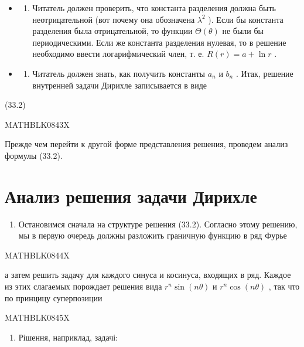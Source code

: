 \documentclass[
  ukrainian,
]{article}
\providecommand{\tightlist}{%
  \setlength{\itemsep}{0pt}\setlength{\parskip}{0pt}}
\begin{document}
\begin{itemize}
\tightlist
\item
  \begin{enumerate}
  \def\labelenumi{\arabic{enumi}.}
  \tightlist
  \item
    Читатель должен проверить, что константа разделения должна быть
    неотрицательной (вот почему она обозначена \(\lambda^2\) ). Если бы
    константа разделения была отрицательной, то функции
    \(\Theta(\theta)\) не были бы периодическими. Если же константа
    разделения нулевая, то в решение необходимо ввести логарифмический
    член, т. е. \(R(r) = a + \ln r\) .
  \end{enumerate}
\item
  \begin{enumerate}
  \def\labelenumi{\arabic{enumi}.}
  \setcounter{enumi}{1}
  \tightlist
  \item
    Читатель должен знать, как получить константы \(a_n\) и \(b_n\) .
    Итак, решение внутренней задачи Дирихле записывается в виде
  \end{enumerate}
\end{itemize}

(33.2)

MATHBLK0843X

Прежде чем перейти к другой форме представления решения, проведем анализ
формулы (33.2).

\section{Анализ решения задачи
Дирихле}\label{ux430ux43dux430ux43bux438ux437-ux440ux435ux448ux435ux43dux438ux44f-ux437ux430ux434ux430ux447ux438-ux434ux438ux440ux438ux445ux43bux435}

\begin{enumerate}
\def\labelenumi{\arabic{enumi}.}
\tightlist
\item
  Остановимся сначала на структуре решения (33.2). Согласно этому
  решению, мы в первую очередь должны разложить граничную функцию в ряд
  Фурье
\end{enumerate}

MATHBLK0844X

а затем решить задачу для каждого синуса и косинуса, входящих в ряд.
Каждое из этих слагаемых порождает решения вида \(r^n \sin{(n\theta)}\)
и \(r^n \cos{(n\theta)}\) , так что по принцицу суперпозиции

MATHBLK0845X

\begin{enumerate}
\def\labelenumi{\arabic{enumi}.}
\setcounter{enumi}{1}
\tightlist
\item
  Рішення, наприклад, задачі:
\end{enumerate}
\end{document}
